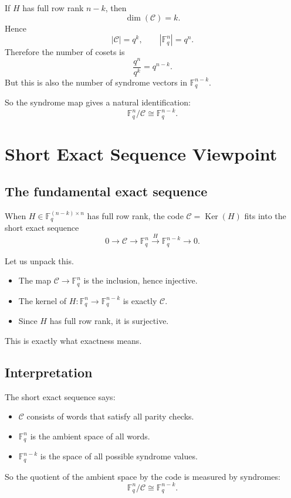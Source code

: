 \documentclass[11pt]{article}
\newcommand{\F}{\mathbb{F}}
\newcommand{\Ker}{\operatorname{Ker}}
\newcommand{\cC}{\mathcal{C}}
\theoremstyle{definition}
\theoremstyle{plain}
\begin{document}
	If \(H\) has full row rank \(n-k\), then
	\[
	\dim(\cC)=k.
	\]
	Hence
	\[
	|\cC|=q^k,
	\qquad
	|\F_q^n|=q^n.
	\]
	Therefore the number of cosets is
	\[
	\frac{q^n}{q^k}=q^{n-k}.
	\]
	But this is also the number of syndrome vectors in \(\F_q^{n-k}\).
	
	So the syndrome map gives a natural identification:
	\[
	\F_q^n/\cC \cong \F_q^{n-k}.
	\]
	
	\section{Short Exact Sequence Viewpoint}
	
	\subsection{The fundamental exact sequence}
	
	When \(H\in \F_q^{(n-k)\times n}\) has full row rank, the code \(\cC=\Ker(H)\) fits into the short exact sequence
	\[
	0 \longrightarrow \cC \longrightarrow \F_q^n \xrightarrow{\,H\,} \F_q^{n-k} \longrightarrow 0.
	\]
	
	Let us unpack this.
	
	\begin{itemize}[leftmargin=2em]
		\item The map \(\cC\to \F_q^n\) is the inclusion, hence injective.
		\item The kernel of \(H:\F_q^n\to \F_q^{n-k}\) is exactly \(\cC\).
		\item Since \(H\) has full row rank, it is surjective.
	\end{itemize}
	
	This is exactly what exactness means.
	
	\subsection{Interpretation}
	
	The short exact sequence says:
	
	\begin{itemize}[leftmargin=2em]
		\item \(\cC\) consists of words that satisfy all parity checks.
		\item \(\F_q^n\) is the ambient space of all words.
		\item \(\F_q^{n-k}\) is the space of all possible syndrome values.
	\end{itemize}
	
	So the quotient of the ambient space by the code is measured by syndromes:
	\[
	\F_q^n/\cC \cong \F_q^{n-k}.
	\]
	
\end{document}
